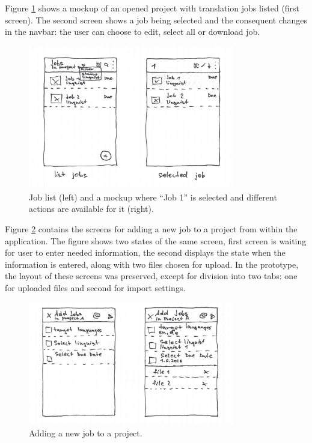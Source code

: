 Figure \ref{mock3} shows a mockup of an opened project with translation jobs listed (first screen). The second screen shows a job being selected and the consequent changes in the navbar: the user can choose to edit, select all or download job.

\begin{figure}[H]
	\includegraphics[width=0.8\textwidth]{pics/jobs1}
	\caption{Job list (left) and a mockup where ``Job 1'' is selected and different actions are available for it (right).}
	\label{mock3}
\end{figure}


Figure \ref{mock4} contains the screens for adding a new job to a project from within the application. The figure shows two states of the same screen, first screen is waiting for user to enter needed information, the second displays the state when the information is entered, along with two files chosen for upload. In the prototype, the layout of these screens was preserved, except for division into two tabs: one for uploaded files and second for import settings.

\begin{figure}[H]
	\includegraphics[width=0.8\textwidth]{pics/addJobs}
	\caption{Adding a new job to a project.}
	\label{mock4}
\end{figure}

